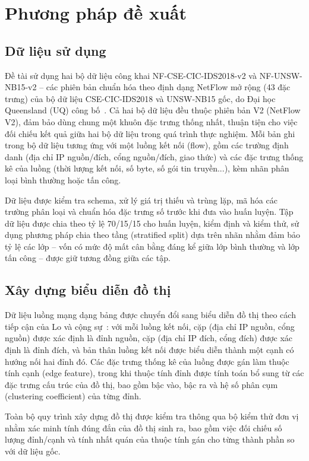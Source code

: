\chapter{Phương pháp đề xuất}

\section{Dữ liệu sử dụng}

Đề tài sử dụng hai bộ dữ liệu công khai NF-CSE-CIC-IDS2018-v2 và NF-UNSW-NB15-v2 -- các phiên bản chuẩn hóa theo định dạng NetFlow mở rộng (43 đặc trưng) của bộ dữ liệu CSE-CIC-IDS2018 và UNSW-NB15 gốc, do Đại học Queensland (UQ) công bố~\cite{sarhan2022standard}. Cả hai bộ dữ liệu đều thuộc phiên bản V2 (NetFlow V2), đảm bảo dùng chung một khuôn đặc trưng thống nhất, thuận tiện cho việc đối chiếu kết quả giữa hai bộ dữ liệu trong quá trình thực nghiệm. Mỗi bản ghi trong bộ dữ liệu tương ứng với một luồng kết nối (flow), gồm các trường định danh (địa chỉ IP nguồn/đích, cổng nguồn/đích, giao thức) và các đặc trưng thống kê của luồng (thời lượng kết nối, số byte, số gói tin truyền...), kèm nhãn phân loại bình thường hoặc tấn công.

Dữ liệu được kiểm tra schema, xử lý giá trị thiếu và trùng lặp, mã hóa các trường phân loại và chuẩn hóa đặc trưng số trước khi đưa vào huấn luyện. Tập dữ liệu được chia theo tỷ lệ 70/15/15 cho huấn luyện, kiểm định và kiểm thử, sử dụng phương pháp chia theo tầng (stratified split) dựa trên nhãn nhằm đảm bảo tỷ lệ các lớp -- vốn có mức độ mất cân bằng đáng kể giữa lớp bình thường và lớp tấn công -- được giữ tương đồng giữa các tập.

\section{Xây dựng biểu diễn đồ thị}

Dữ liệu luồng mạng dạng bảng được chuyển đổi sang biểu diễn đồ thị theo cách tiếp cận của Lo và cộng sự~\cite{lo2022egraphsage}: với mỗi luồng kết nối, cặp (địa chỉ IP nguồn, cổng nguồn) được xác định là đỉnh nguồn, cặp (địa chỉ IP đích, cổng đích) được xác định là đỉnh đích, và bản thân luồng kết nối được biểu diễn thành một cạnh có hướng nối hai đỉnh đó. Các đặc trưng thống kê của luồng được gán làm thuộc tính cạnh (edge feature), trong khi thuộc tính đỉnh được tính toán bổ sung từ các đặc trưng cấu trúc của đồ thị, bao gồm bậc vào, bậc ra và hệ số phân cụm (clustering coefficient) của từng đỉnh.

Toàn bộ quy trình xây dựng đồ thị được kiểm tra thông qua bộ kiểm thử đơn vị nhằm xác minh tính đúng đắn của đồ thị sinh ra, bao gồm việc đối chiếu số lượng đỉnh/cạnh và tính nhất quán của thuộc tính gán cho từng thành phần so với dữ liệu gốc.

